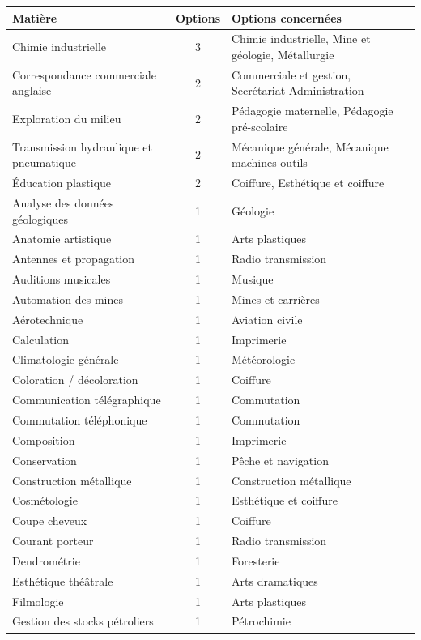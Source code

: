 \documentclass[11pt,a4paper]{article}
\begin{document}
\begin{longtable}{@{}>{\raggedright\arraybackslash}p{5cm}c>{\raggedright\arraybackslash}p{8.4cm}@{}}
\toprule
\textbf{Matière} & \textbf{Options} & \textbf{Options concernées}\\
\midrule\endhead
Chimie industrielle & 3 & Chimie industrielle, Mine et géologie, Métallurgie\\
Correspondance commerciale anglaise & 2 & Commerciale et gestion, Secrétariat-Administration\\
Exploration du milieu & 2 & Pédagogie maternelle, Pédagogie pré-scolaire\\
Transmission hydraulique et pneumatique & 2 & Mécanique générale, Mécanique machines-outils\\
Éducation plastique & 2 & Coiffure, Esthétique et coiffure\\
Analyse des données géologiques & 1 & Géologie\\
Anatomie artistique & 1 & Arts plastiques\\
Antennes et propagation & 1 & Radio transmission\\
Auditions musicales & 1 & Musique\\
Automation des mines & 1 & Mines et carrières\\
Aérotechnique & 1 & Aviation civile\\
Calculation & 1 & Imprimerie\\
Climatologie générale & 1 & Météorologie\\
Coloration / décoloration & 1 & Coiffure\\
Communication télégraphique & 1 & Commutation\\
Commutation téléphonique & 1 & Commutation\\
Composition & 1 & Imprimerie\\
Conservation & 1 & Pêche et navigation\\
Construction métallique & 1 & Construction métallique\\
Cosmétologie & 1 & Esthétique et coiffure\\
Coupe cheveux & 1 & Coiffure\\
Courant porteur & 1 & Radio transmission\\
Dendrométrie & 1 & Foresterie\\
Esthétique théâtrale & 1 & Arts dramatiques\\
Filmologie & 1 & Arts plastiques\\
Gestion des stocks pétroliers & 1 & Pétrochimie\\

\end{longtable}
\end{document}
